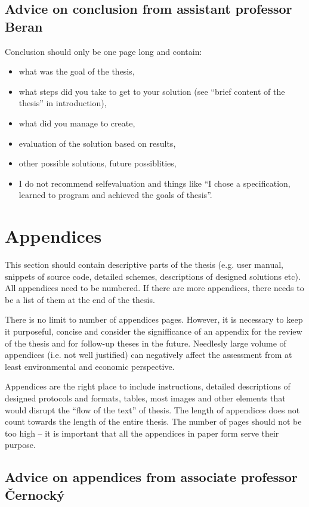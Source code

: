 \subsection*{Advice on conclusion from assistant professor Beran}
Conclusion should only be one page long and contain:
    \begin{itemize}
      \item{what was the goal of the thesis,}
      \item{what steps did you take to get to your solution (see ``brief content of the thesis'' in introduction),}
      \item{what did you manage to create,}
      \item{evaluation of the solution based on results,}
      \item{other possible solutions, future possiblities,}
      \item{I do not recommend selfevaluation and things like ``I chose a specification, learned to program and achieved the goals of thesis''.}
    \end{itemize}

\section{Appendices}

This section should contain descriptive parts of the thesis (e.g. user manual, snippets of source code, detailed schemes, descriptions of designed solutions etc). All appendices need to be numbered. If there are more appendices, there needs to be a list of them at the end of the thesis. \cite{fitWeb}

There is no limit to number of appendices pages. However, it is necessary to keep it purposeful, concise and consider the signifficance of an appendix for the review of the thesis and for follow-up theses in the future. Needlesly large volume of appendices (i.e. not well justified) can negatively affect the assessment from at least environmental and economic perspective. \cite{fitWeb}

Appendices are the right place to include instructions, detailed descriptions of designed protocols and formats, tables, most images and other elements that would disrupt the ``flow of the text'' of thesis. The length of appendices does not count towards the length of the entire thesis. The number of pages should not be too high -- it is important that all the appendices in paper form serve their purpose.


\subsection*{Advice on appendices from associate professor Černocký}

